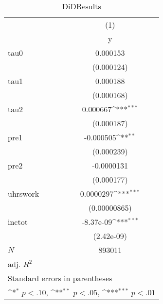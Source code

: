 \begin{table}[htbp]\centering
\def\sym#1{\ifmmode^{#1}\else\(^{#1}\)\fi}
\caption{DiDResults}
\begin{tabular}{l*{1}{c}}
\hline\hline
            &\multicolumn{1}{c}{(1)}\\
            &\multicolumn{1}{c}{y}\\
\hline
tau0        &    0.000153         \\
            &  (0.000124)         \\
[1em]
tau1        &    0.000188         \\
            &  (0.000168)         \\
[1em]
tau2        &    0.000667\sym{***}\\
            &  (0.000187)         \\
[1em]
pre1        &   -0.000505\sym{**} \\
            &  (0.000239)         \\
[1em]
pre2        &  -0.0000131         \\
            &  (0.000177)         \\
[1em]
uhrswork    &   0.0000297\sym{***}\\
            &(0.00000865)         \\
[1em]
inctot      &   -8.37e-09\sym{***}\\
            &  (2.42e-09)         \\
\hline
\(N\)       &      893011         \\
adj. \(R^{2}\)&                     \\
\hline\hline
\multicolumn{2}{l}{\footnotesize Standard errors in parentheses}\\
\multicolumn{2}{l}{\footnotesize \sym{*} \(p<.10\), \sym{**} \(p<.05\), \sym{***} \(p<.01\)}\\
\end{tabular}
\end{table}
